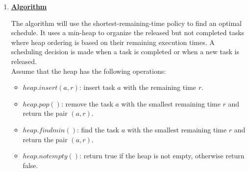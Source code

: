 \documentclass[11pt]{article}
\begin{document}
\begin{enumerate}
\begin{enumerate}
\begin{proof}
\begin{enumerate}
    So we can get another optimal schedule sequence by exchanging the order of
    $a_i$ and $a_j$ because since $t_i = t_j$, the exchange will not
    affect the overall average completion time. And this new optimal
    schedule sequence has $A'$ as a prefix-subsequence. The lemma
    still holds.
  \end{enumerate}
\end{proof}

\textbf{Theorem:} The greedy algorithm finds an optimal schedule sequence.

\begin{proof}
  Initially, $A$ is a empty sequence, which is always a
  prefix-subsequence of any schedule sequence. Suppose all $n$ tasks
  $a_1,a_2,\cdots,a_n$ have been sorted in the order of increasing
  execution time. By the lemma, $\{a_1\}$ is a prefix-subsequence of
  an optimal schedule sequence. 
  
  By induction on the number of iterations, when the algorithm
  terminates, $A$ is still a prefix-subsequence of an optimal schedule
  sequence. And when the algorithm terminates, $A$ would contain all
  $n$ tasks, no other schedule sequence can properly contain $A$, thus
  $A$ is the optimal schedule sequence.
\end{proof}

\item %

\underline{\textbf{Algorithm}}

The algorithm will use the shortest-remaining-time policy to find an
optimal schedule. It uses a min-heap to organize the released but not
completed tasks where heap ordering is based on their remaining
execution times. A scheduling decision is made when a task is
completed or when a new task is released.\\

Assume that the heap has the following operations:
\begin{itemize}
\item $heap.insert(a,r)$: insert task $a$ with the remaining time $r$.
\item $heap.pop()$: remove the task $a$ with the smallest remaining
  time $r$ and return the pair $(a,r)$.
\item $heap.findmin()$: find the task $a$ with the smallest remaining
  time $r$ and return the pair $(a,r)$.
\item $heap.notempty()$: return true if the heap is not empty,
  otherwise return false.\\
\end{itemize}


\end{enumerate}
\end{enumerate}
\end{document}
